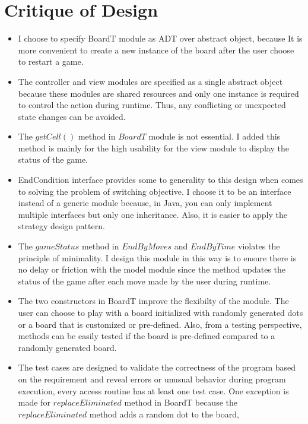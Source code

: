\documentclass[12pt]{article}
\begin{document}
\newpage

\section*{Critique of Design}

\begin{itemize}
  \item I choose to specify BoardT module as ADT over abstract object, because It is more convenient to create a new instance of the board after the 
        user choose to restart a game.
  \item The controller and view modules are specified as a single abstract object because these modules are shared resources and only one instance is required
        to control the action during runtime. Thus, any conflicting or unexpected state changes can be avoided.
  \item The $getCell()$ method in $BoardT$ module is not essential. I added this method 
        is mainly for the high usability for the view module to display the status of the game.
  \item EndCondition interface provides some to generality to this design when comes to solving the problem of switching objective.
        I choose it to be an interface instead of a generic module because, in Java, you can only implement multiple interfaces but only one inheritance. Also, it 
        is easier to apply the strategy design pattern.
  \item The $gameStatus$ method in $EndByMoves$ and $EndByTime$ violates the principle of minimality. I design this module in this way is to ensure
        there is no delay or friction with the model module since the method updates the status of the game after each move made by the user during runtime.
  \item The two constructors in BoardT improve the flexibilty of the module. The user can choose to play with a board 
        initialized with randomly generated dots or a board that is customized or pre-defined. Also, from a testing perspective, methods can be 
        easily tested if the board is pre-defined compared to a randomly generated board.
  \item The test cases are designed to validate the correctness of the program based on the requirement and reveal errors
        or unusual behavior during program execution, every access routine has at least one test case. One exception is
        made for $replaceEliminated$ method in BoardT because the $replaceEliminated$ method adds a random dot to the board, 

\end{itemize}
\end{document}
